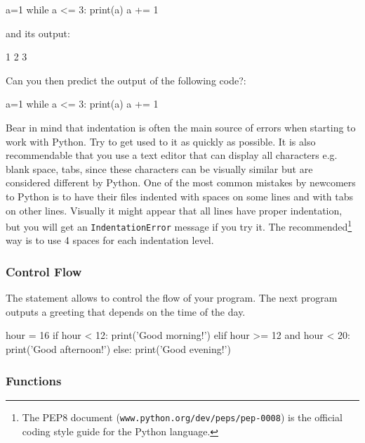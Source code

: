 \begin{python}
a=1
while a <= 3:
    print(a)
    a += 1
\end{python}

\noindent and its output:

\begin{python}
1
2
3
\end{python}


\begin{exercise}
Can you then predict the output of the following code?:

\begin{python}
a=1
while a <= 3:
    print(a)
a += 1
\end{python}

\end{exercise}

\noindent Bear in mind that indentation is often the main source of errors when starting to work with Python. Try to get used to it as quickly as possible. It is also recommendable that you use a text editor that can display all characters e.g. blank space, tabs, since these characters can be visually similar but are considered different by Python. One of the most common mistakes by newcomers to Python is to have their files indented with spaces on some lines and with tabs on other lines. Visually it might appear that all lines have proper indentation, but you will get an \texttt{IndentationError} message if you try it. The recommended\footnote{The PEP8 document (\texttt{www.python.org/dev/peps/pep-0008}) is the official coding style guide for the Python language.} way is to use 4 spaces for each indentation level.

\subsubsection{Control Flow}

The  statement allows to control the flow of your program. The next program outputs a greeting that depends on the time of the day.

\begin{python}
hour = 16
if hour < 12:
    print('Good morning!')
elif hour >= 12 and hour < 20:
    print('Good afternoon!')
else:
    print('Good evening!')
\end{python}

\subsubsection{Functions}

